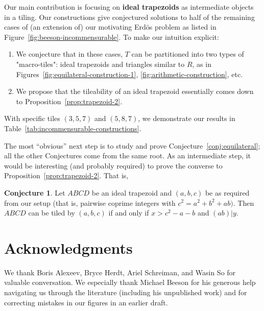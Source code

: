\documentclass{amsart}
\theoremstyle{plain}
\theoremstyle{definition}
\newtheorem{conj}{Conjecture}
\begin{document}
Our main contribution is focusing on \textbf{ideal trapezoids} as intermediate objects in a tiling. Our constructions give conjectured solutions to half of the remaining cases of (an extension of) our motivating Erd\"{o}s problem as listed in Figure~\ref{fig:beeson-incommensurable}. To make our intuition explicit:
\begin{enumerate}
    \item We conjecture that in these cases, $T$ can be partitioned into two types of "macro-tiles": ideal trapezoids and triangles similar to $R$, as in Figures~\ref{fig:equilateral-construction-1}, \ref{fig:arithmetic-construction}, etc.
    \item We propose that the tileability of an ideal trapezoid essentially comes down to Proposition~\ref{prop:trapezoid-2}. 
\end{enumerate}

With specific tiles $(3,5,7)$ and $(5,8,7)$, we demonstrate our results in Table~\ref{tab:incommensurable-constructions}. 

The most ``obvious'' next step is to study and prove Conjecture~\ref{conj:equilateral}; all the other Conjectures come from the same root. As an intermediate step, it would be interesting (and probably required) to prove the converse to Proposition~\ref{prop:trapezoid-2}. That is,
\begin{conj}
    \label{conj:trapezoid}
    Let $ABCD$ be an ideal trapezoid and $(a,b,c)$ be as required from our setup (that is, pairwise coprime integers with $c^2 = a^2 + b^2 + ab)$. Then $ABCD$ can be tiled by $(a,b,c)$ if and only if $x > c^2-a-b$ and $(ab)|y$.
\end{conj}



\section*{Acknowledgments}
We thank Boris Alexeev, Bryce Herdt, Ariel Schreiman, and Wasin So for valuable conversation. We especially thank Michael Beeson for his generous help navigating us through the literature (including his unpublished work) and for correcting mistakes in our figures in an earlier draft.





% 
\end{document}
